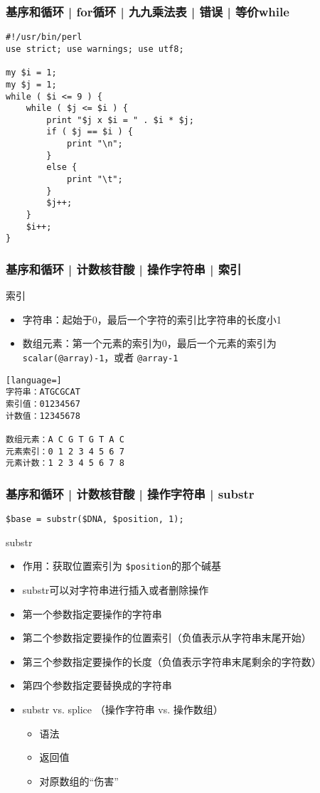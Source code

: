 \begin{frame}[fragile]
  \frametitle{基序和循环 | for循环 | 九九乘法表 | 错误 | 等价while}
\begin{lstlisting}[basicstyle=\small\tt,numberstyle=\footnotesize]
#!/usr/bin/perl 
use strict; use warnings; use utf8;

my $i = 1;
my $j = 1;
while ( $i <= 9 ) {
    while ( $j <= $i ) {
        print "$j x $i = " . $i * $j;
        if ( $j == $i ) {
            print "\n";
        }
        else {
            print "\t";
        }
        $j++;
    }
    $i++;
}
\end{lstlisting}
\end{frame}


\begin{frame}[fragile]
  \frametitle{基序和循环 | 计数核苷酸 | 操作字符串 | \alert{索引}}
  \begin{block}{索引}
  \begin{itemize}
    \item 字符串：起始于0，最后一个字符的索引比字符串的长度小1
    \item 数组元素：第一个元素的索引为0，最后一个元素的索引为 \verb|scalar(@array)-1|，或者 \verb|@array-1|
  \end{itemize}
  \end{block}
  \pause
\begin{lstlisting}[language=]
字符串：ATGCGCAT
索引值：01234567
计数值：12345678

数组元素：A C G T G T A C
元素索引：0 1 2 3 4 5 6 7
元素计数：1 2 3 4 5 6 7 8
\end{lstlisting}
\end{frame}

\begin{frame}[fragile]
  \frametitle{基序和循环 | 计数核苷酸 | 操作字符串 | \alert{substr}}
\begin{lstlisting}
$base = substr($DNA, $position, 1);
\end{lstlisting}
\pause
\begin{block}{substr}
  \begin{itemize}
    \item 作用：获取位置索引为 \verb|$position|的那个碱基
    \item substr可以对字符串进行插入或者删除操作
    \item 第一个参数指定要操作的字符串
    \item 第二个参数指定要操作的位置索引（负值表示从字符串末尾开始）
    \item 第三个参数指定要操作的长度（负值表示字符串末尾剩余的字符数）
    \item 第四个参数指定要替换成的字符串
    \item substr vs. splice （操作字符串 vs. 操作数组）
      \begin{itemize}
        \item 语法
        \item 返回值
        \item 对原数组的“伤害”
      \end{itemize}
  \end{itemize}
\end{block}
\end{frame}

